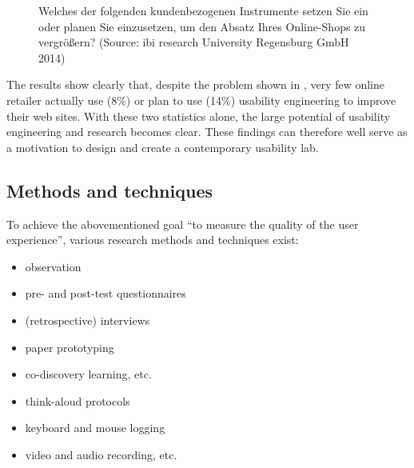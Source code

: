 \documentclass[output=paper]{langsci/langscibook}
\begin{document}
\begin{figure}[t]

   
  
 \caption{Welches der folgenden kundenbezogenen Instrumente setzen 
		  Sie  ein oder planen Sie einzusetzen, um den Absatz Ihres 
		  Online-Shops zu vergrößern? (Source: ibi research University Regensburg GmbH 2014)}
 \label{roesener:fig:2}
\end{figure} 



The results show clearly that, despite the problem shown in , very few online retailer actually use (8\%) or plan to use (14\%) usability engineering to improve their web sites. With these two statistics alone, the large potential of usability engineering and research becomes clear. These findings can therefore well serve as a motivation to design and create a contemporary usability lab.

\subsection{Methods and techniques}

To achieve the abovementioned goal ``to measure the quality of the user experience'', various research methods and techniques exist:

\begin{itemize}
\item observation
\item pre- and post-test questionnaires 
\item (retrospective) interviews 
\item paper prototyping 
\item co-discovery learning, etc.
\item think-aloud protocols 
\item keyboard and mouse logging 
\item video and audio recording, etc. 
\end{itemize}
\end{document}
